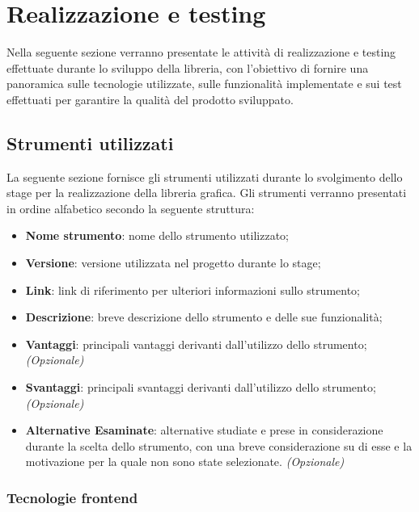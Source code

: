 \chapter{Realizzazione e testing}
\label{chap:realizzazione-testing}
Nella seguente sezione verranno presentate le attività di realizzazione e testing effettuate durante lo sviluppo della libreria, con l'obiettivo di fornire una panoramica
sulle tecnologie utilizzate, sulle funzionalità implementate e sui test effettuati per garantire la qualità del prodotto sviluppato.

\section{Strumenti utilizzati}
La seguente sezione fornisce gli strumenti utilizzati durante lo svolgimento dello stage per la realizzazione della libreria grafica.
Gli strumenti verranno presentati in ordine alfabetico secondo la seguente struttura:
\begin{itemize}
    \item \textbf{Nome strumento}: nome dello strumento utilizzato;
    \item \textbf{Versione}: versione utilizzata nel progetto durante lo stage;
    \item \textbf{Link}: link di riferimento per ulteriori informazioni sullo strumento;
    \item \textbf{Descrizione}: breve descrizione dello strumento e delle sue funzionalità;
    \item \textbf{Vantaggi}: principali vantaggi derivanti dall'utilizzo dello strumento; \textit{(Opzionale)}
    \item \textbf{Svantaggi}: principali svantaggi derivanti dall'utilizzo dello strumento; \textit{(Opzionale)}
    \item \textbf{Alternative Esaminate}: alternative studiate e prese in considerazione durante la scelta dello strumento, con una breve considerazione
          su di esse e la motivazione per la quale non sono state selezionate. \textit{(Opzionale)}
\end{itemize}

\subsection{Tecnologie frontend}

